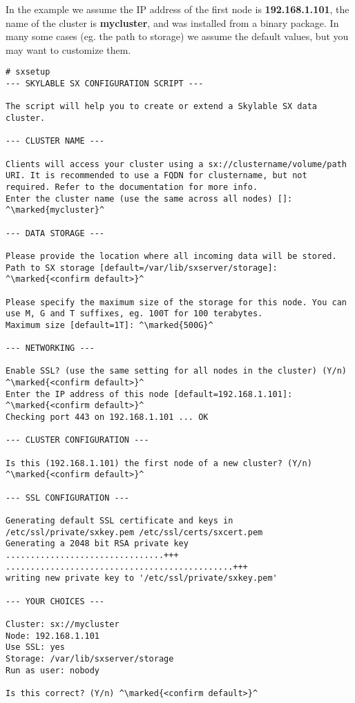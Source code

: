 In the example we assume the IP address of the first node is
\textbf{192.168.1.101}, the name of the cluster is \textbf{mycluster},
and \SX was installed from a binary package. In many some cases (eg. the
path to \SX storage) we assume the default values, but you may want to
customize them.

\begin{lstlisting}
# sxsetup
--- SKYLABLE SX CONFIGURATION SCRIPT ---

The script will help you to create or extend a Skylable SX data
cluster.

--- CLUSTER NAME ---

Clients will access your cluster using a sx://clustername/volume/path
URI. It is recommended to use a FQDN for clustername, but not
required. Refer to the documentation for more info.
Enter the cluster name (use the same across all nodes) []: ^\marked{mycluster}^

--- DATA STORAGE ---

Please provide the location where all incoming data will be stored.
Path to SX storage [default=/var/lib/sxserver/storage]: ^\marked{<confirm default>}^

Please specify the maximum size of the storage for this node. You can
use M, G and T suffixes, eg. 100T for 100 terabytes.
Maximum size [default=1T]: ^\marked{500G}^

--- NETWORKING ---

Enable SSL? (use the same setting for all nodes in the cluster) (Y/n)
^\marked{<confirm default>}^
Enter the IP address of this node [default=192.168.1.101]: ^\marked{<confirm default>}^
Checking port 443 on 192.168.1.101 ... OK

--- CLUSTER CONFIGURATION ---

Is this (192.168.1.101) the first node of a new cluster? (Y/n)
^\marked{<confirm default>}^

--- SSL CONFIGURATION ---

Generating default SSL certificate and keys in
/etc/ssl/private/sxkey.pem /etc/ssl/certs/sxcert.pem
Generating a 2048 bit RSA private key
................................+++
..............................................+++
writing new private key to '/etc/ssl/private/sxkey.pem'

--- YOUR CHOICES ---

Cluster: sx://mycluster
Node: 192.168.1.101
Use SSL: yes
Storage: /var/lib/sxserver/storage
Run as user: nobody

Is this correct? (Y/n) ^\marked{<confirm default>}^


\end{lstlisting}
